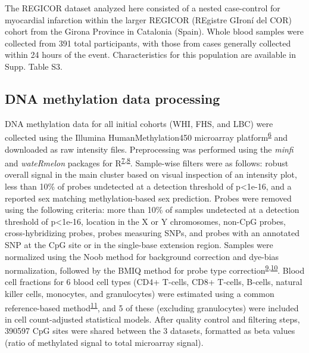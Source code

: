 \documentclass[]{article}
\begin{document}
The REGICOR dataset analyzed here consisted of a nested case-control for
myocardial infarction within the larger REGICOR (REgistre GIroní del
COR) cohort from the Girona Province in Catalonia (Spain). Whole blood
samples were collected from 391 total participants, with those from
cases generally collected within 24 hours of the event. Characteristics
for this population are available in Supp. Table S3.

\hypertarget{dna-methylation-data-processing}{%
\subsection{DNA methylation data
processing}\label{dna-methylation-data-processing}}

DNA methylation data for all initial cohorts (WHI, FHS, and LBC) were
collected using the Illumina HumanMethylation450 microarray
platform\textsuperscript{\protect\hyperlink{ref-Bibikova2011}{6}} and
downloaded as raw intensity files. Preprocessing was performed using the
\emph{minfi} and \emph{wateRmelon} packages for
R\textsuperscript{\protect\hyperlink{ref-Aryee2014}{7},\protect\hyperlink{ref-Pidsley2013}{8}}.
Sample-wise filters were as follows: robust overall signal in the main
cluster based on visual inspection of an intensity plot, less than 10\%
of probes undetected at a detection threshold of p\textless{}1e-16, and
a reported sex matching methylation-based sex prediction. Probes were
removed using the following criteria: more than 10\% of samples
undetected at a detection threshold of p\textless{}1e-16, location in
the X or Y chromosomes, non-CpG probes, cross-hybridizing probes, probes
measuring SNPs, and probes with an annotated SNP at the CpG site or in
the single-base extension region. Samples were normalized using the Noob
method for background correction and dye-bias normalization, followed by
the BMIQ method for probe type
correction\textsuperscript{\protect\hyperlink{ref-Fortin2016}{9},\protect\hyperlink{ref-Teschendorff2013}{10}}.
Blood cell fractions for 6 blood cell types (CD4+ T-cells, CD8+ T-cells,
B-cells, natural killer cells, monocytes, and granulocytes) were
estimated using a common reference-based
method\textsuperscript{\protect\hyperlink{ref-Houseman2012}{11}}, and 5
of these (excluding granulocytes) were included in cell count-adjusted
statistical models. After quality control and filtering steps, 390597
CpG sites were shared between the 3 datasets, formatted as beta values
(ratio of methylated signal to total microarray signal).
\end{document}
